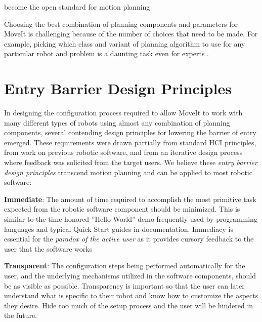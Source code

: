 \documentclass[10pt,journal,compsoc]{joser1}
\begin{document}
{become the open standard for motion planning

Choosing the best combination of planning components and parameters for MoveIt is challenging because of the number of choices that need to be made. For example, picking which class and variant of planning algorithm to use for any particular robot and problem is a daunting task even for experts \cite{cohen2012generic}.

\section{Entry Barrier Design Principles}
\label{sec::requirements}

In designing the configuration process required to allow MoveIt to work with many different types of robots using almost any combination of planning components, several contending design principles for lowering the barrier of entry emerged. These requirements were drawn partially from standard HCI principles, from work on previous robotic software, and from an iterative design process where feedback was solicited from the target users. We believe these \textit{entry barrier design principles} transcend motion planning and can be applied to most robotic software:

{\bf Immediate}: The amount of time required to accomplish the most primitive task expected from the robotic software component should be minimized. This is similar to the time-honored ''Hello World'' demo frequently used by programming languages and typical Quick Start guides in documentation. Immediacy is essential for the \textit{paradox of the active user} as it provides cursory feedback to the user that the software works

{\bf Transparent}: The configuration steps being performed automatically for the user, and the underlying mechanisms utilized in the software components, should be as visible as possible. Transparency is important so that the user can later understand what is specific to their robot and know how to customize the aspects they desire. Hide too much of the setup process and the user will be hindered in the future.

}
\end{document}
